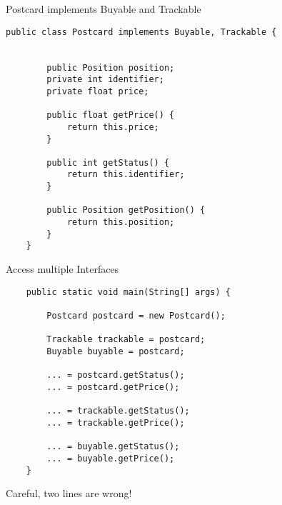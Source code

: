 \begin{frame}[fragile]{Postcard implements Buyable and Trackable}
    \begin{lstlisting}[basicstyle=\ttfamily\scriptsize]
    public class Postcard implements Buyable, Trackable {
    
    
        public Position position;
        private int identifier;
        private float price;
        
        public float getPrice() {
            return this.price;
        }
    
        public int getStatus() {
            return this.identifier;
        }
        
        public Position getPosition() {
            return this.position;
        }
    }\end{lstlisting}
\end{frame}

\begin{frame}[fragile]{Access multiple Interfaces}
    \begin{lstlisting}
    public static void main(String[] args) {
    
        Postcard postcard = new Postcard();
        
        Trackable trackable = postcard;
        Buyable buyable = postcard;

        ... = postcard.getStatus();
        ... = postcard.getPrice();
        
        ... = trackable.getStatus();
        ... = trackable.getPrice();
        
        ... = buyable.getStatus();
        ... = buyable.getPrice();
    }\end{lstlisting}
    Careful, two lines are wrong!
\end{frame}
